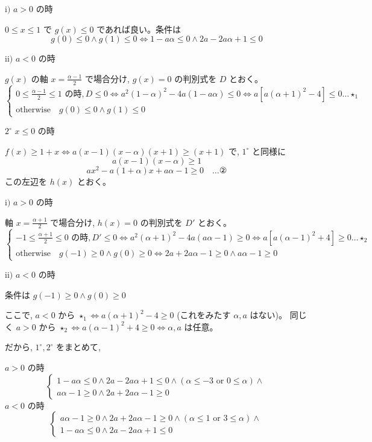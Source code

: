 \documentclass[../main.tex]{subfiles}
\begin{document}
$\text{i)}$ $a > 0$ の時

$0 \le x \le 1$ で $g(x) \le 0$ であれば良い。条件は
\[
g(0) \le 0 \land g(1) \le 0 \iff 1 - a\alpha \le 0 \land 2a - 2a\alpha + 1 \le 0
\]

$\text{ii)}$ $a < 0$ の時

$g(x)$ の軸 $x = \frac{\alpha - 1}{2}$ で場合分け, $g(x) = 0$ の判別式を $D$ とおく。
\[
\begin{cases}
0 \le \frac{\alpha-1}{2} \le 1 \text{ の時}, D \le 0 \iff a^2(1-\alpha)^2 - 4a(1-a\alpha) \le 0 \iff a \left[ a(\alpha+1)^2 - 4 \right] \le 0 \dots \star_1 \\
\text{otherwise} \quad g(0) \le 0 \land g(1) \le 0
\end{cases}
\]

$2^\circ$ $x \le 0$ の時

$f(x) \ge 1+x \iff a(x-1)(x-\alpha)(x+1) \ge (x+1)$ で, $1^\circ$ と同様に
\[
a(x-1)(x-\alpha) \ge 1
\]
\[
a x^2 - a(1+\alpha) x + a\alpha - 1 \ge 0 \quad \dots \text{②}
\]
この左辺を $h(x)$ とおく。

$\text{i)}$ $a > 0$ の時

軸 $x = \frac{\alpha+1}{2}$ で場合分け, $h(x)=0$ の判別式を $D'$ とおく。
\[
\begin{cases}
-1 \le \frac{\alpha+1}{2} \le 0 \text{ の時}, D' \le 0 \iff a^2(\alpha+1)^2 - 4a(a\alpha-1) \ge 0 \iff a \left[ a(\alpha-1)^2 + 4 \right] \ge 0 \dots \star_2 \\
\text{otherwise} \quad g(-1) \ge 0 \land g(0) \ge 0 \iff 2a + 2a\alpha - 1 \ge 0 \land a\alpha - 1 \ge 0
\end{cases}
\]

$\text{ii)}$ $a < 0$ の時

条件は $g(-1) \ge 0 \land g(0) \ge 0$

ここで, $a < 0$ から $\star_1 \iff a(\alpha+1)^2 - 4 \ge 0$ (これをみたす $\alpha, a$ はない)。
同じく $a > 0$ から $\star_2 \iff a(\alpha-1)^2 + 4 \ge 0 \iff \alpha, a$ は任意。

だから, $1^\circ, 2^\circ$ をまとめて,

$a > 0$ の時
\[
\begin{cases}
1 - a\alpha \le 0 \land 2a - 2a\alpha + 1 \le 0 \land (\alpha \le -3 \text{ or } 0 \le \alpha) \land \\
a\alpha - 1 \ge 0 \land 2a + 2a\alpha - 1 \ge 0
\end{cases}
\]
$a < 0$ の時
\[
\begin{cases}
a\alpha - 1 \ge 0 \land 2a + 2a\alpha - 1 \ge 0 \land (\alpha \le 1 \text{ or } 3 \le \alpha) \land \\
1 - a\alpha \le 0 \land 2a - 2a\alpha + 1 \le 0
\end{cases}
\]
\end{document}

